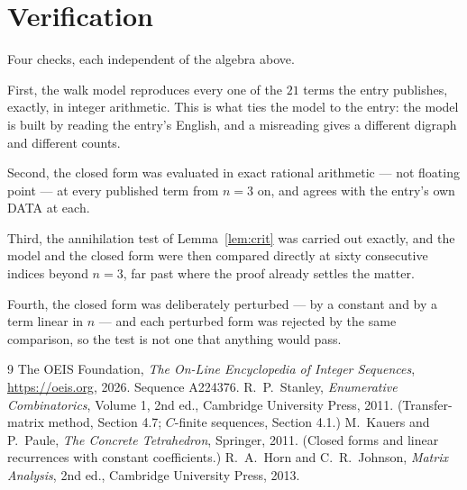 \documentclass[11pt,a4paper]{article}
\theoremstyle{plain}
\theoremstyle{definition}
\begin{document}
\section{Verification}

Four checks, each independent of the algebra above.

First, the walk model reproduces every one of the $21$ terms the entry publishes,
exactly, in integer arithmetic. This is what ties the model to the entry: the model is built
by reading the entry's English, and a misreading gives a different digraph and different
counts.

Second, the closed form was evaluated in exact rational arithmetic --- not floating point ---
at every published term from $n=3$ on, and agrees with the entry's own DATA at each.

Third, the annihilation test of Lemma~\ref{lem:crit} was carried out exactly, and the model
and the closed form were then compared directly at sixty consecutive indices beyond
$n=3$, far past where the proof already settles the matter.

Fourth, the closed form was deliberately perturbed --- by a constant and by a term linear in
$n$ --- and each perturbed form was rejected by the same comparison, so the test is not one
that anything would pass.

\begin{thebibliography}{9}
 The OEIS Foundation, \emph{The On-Line Encyclopedia of Integer
Sequences}, \url{https://oeis.org}, 2026. Sequence A224376.
 R.~P.~Stanley, \emph{Enumerative Combinatorics}, Volume 1, 2nd ed.,
Cambridge University Press, 2011. (Transfer-matrix method, Section 4.7; $C$-finite sequences,
Section 4.1.)
 M.~Kauers and P.~Paule, \emph{The Concrete Tetrahedron}, Springer, 2011.
(Closed forms and linear recurrences with constant coefficients.)
 R.~A.~Horn and C.~R.~Johnson, \emph{Matrix Analysis}, 2nd ed., Cambridge
University Press, 2013.
\end{thebibliography}
\end{document}
